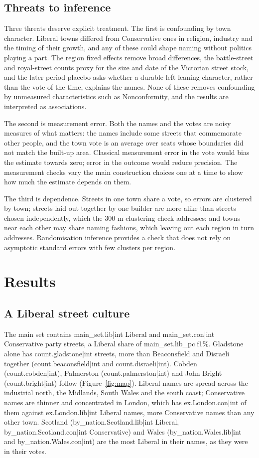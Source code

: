 \documentclass[11pt,a4paper]{article}
\begin{document}
\subsection{Threats to inference}
Three threats deserve explicit treatment. The first is confounding by town character. Liberal towns differed from Conservative ones in religion, industry and the timing of their growth, and any of these could shape naming without politics playing a part. The region fixed effects remove broad differences, the battle-street and royal-street counts proxy for the size and date of the Victorian street stock, and the later-period placebo asks whether a durable left-leaning character, rather than the vote of the time, explains the names. None of these removes confounding by unmeasured characteristics such as Nonconformity, and the results are interpreted as associations.

The second is measurement error. Both the names and the votes are noisy measures of what matters: the names include some streets that commemorate other people, and the town vote is an average over seats whose boundaries did not match the built-up area. Classical measurement error in the vote would bias the estimate towards zero; error in the outcome would reduce precision. The measurement checks vary the main construction choices one at a time to show how much the estimate depends on them.

The third is dependence. Streets in one town share a vote, so errors are clustered by town; streets laid out together by one builder are more alike than streets chosen independently, which the 300 m clustering check addresses; and towns near each other may share naming fashions, which leaving out each region in turn addresses. Randomisation inference provides a check that does not rely on asymptotic standard errors with few clusters per region.

\section{Results}
\subsection{A Liberal street culture}
The main set contains {{main_set.lib|int}} Liberal and {{main_set.con|int}} Conservative party streets, a Liberal share of {{main_set.lib_pc|f1}}\%. Gladstone alone has {{count.gladstone|int}} streets, more than Beaconsfield and Disraeli together ({{count.beaconsfield|int}} and {{count.disraeli|int}}). Cobden ({{count.cobden|int}}), Palmerston ({{count.palmerston|int}}) and John Bright ({{count.bright|int}}) follow (Figure~\ref{fig:map}). Liberal names are spread across the industrial north, the Midlands, South Wales and the south coast; Conservative names are thinner and concentrated in London, which has {{ex.London.con|int}} of them against {{ex.London.lib|int}} Liberal names, more Conservative names than any other town. Scotland ({{by_nation.Scotland.lib|int}} Liberal, {{by_nation.Scotland.con|int}} Conservative) and Wales ({{by_nation.Wales.lib|int}} and {{by_nation.Wales.con|int}}) are the most Liberal in their names, as they were in their votes.
\end{document}
